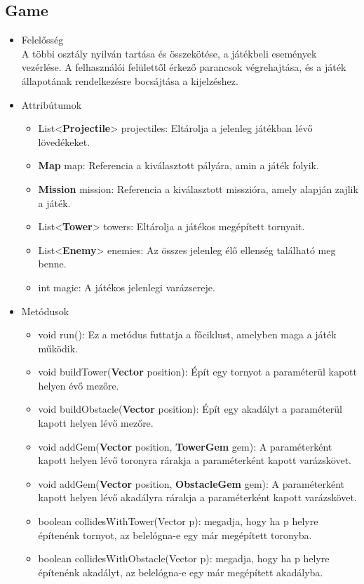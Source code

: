 \subsection{Game}
\begin{itemize}
\item Felelősség\\
A többi osztály nyilván tartása és összekötése, a játékbeli események vezérlése. A felhasználói felülettől érkező parancsok végrehajtása, és a játék állapotának rendelkezésre bocsájtása a kijelzéshez.
\item Attribútumok
	\begin{itemize}
		\item List<\textbf{Projectile}> projectiles: Eltárolja a jelenleg játékban lévő lövedékeket.
		\item \textbf{Map} map: Referencia a kiválasztott pályára, amin a játék folyik.
		\item \textbf{Mission} mission: Referencia a kiválasztott misszióra, amely alapján zajlik a játék.
		\item List<\textbf{Tower}> towers: Eltárolja a játékos megépített tornyait.
		\item List<\textbf{Enemy}> enemies: Az összes jelenleg élő ellenség található meg benne.
		\item int magic: A játékos jelenlegi varázsereje.
	\end{itemize}
\item Metódusok
	\begin{itemize}
		\item void run(): Ez a metódus futtatja a főciklust, amelyben maga a játék működik.
		\item void buildTower(\textbf{Vector} position): Épít egy tornyot a paraméterül kapott helyen évő mezőre.
		\item void buildObstacle(\textbf{Vector} position): Épít egy akadályt a paraméterül kapott helyen lévő mezőre.
		\item void addGem(\textbf{Vector} position, \textbf{TowerGem} gem): A paraméterként kapott helyen lévő toronyra rárakja a paraméterként kapott varázskövet.
		\item void addGem(\textbf{Vector} position, \textbf{ObstacleGem} gem): A paraméterként kapott helyen lévő akadályra rárakja a paraméterként kapott varázskövet.
		\item boolean collidesWithTower(Vector p): megadja, hogy ha p helyre építenénk tornyot, az belelógna-e egy már megépített toronyba.
		\item boolean collidesWithObstacle(Vector p): megadja, hogy ha p helyre építenénk akadályt, az belelógna-e egy már megépített akadályba.
	\end{itemize}
\end{itemize}





